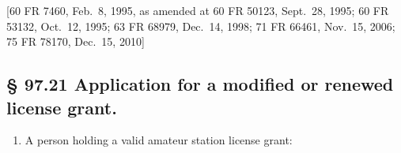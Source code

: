 \documentclass[
  letterpaper,
  DIV=11,
  numbers=noendperiod]{scrreport}
\providecommand{\tightlist}{%
  \setlength{\itemsep}{0pt}\setlength{\parskip}{0pt}}\usepackage{longtable,booktabs,array}
\begin{document}
{[}60 FR 7460, Feb.~8, 1995, as amended at 60 FR 50123, Sept.~28, 1995;
60 FR 53132, Oct.~12, 1995; 63 FR 68979, Dec.~14, 1998; 71 FR 66461,
Nov.~15, 2006; 75 FR 78170, Dec.~15, 2010{]}

\hypertarget{97.21}{%
\subsection*{§ 97.21 Application for a modified or renewed license
grant.}\label{97.21}}

\begin{enumerate}
\def\labelenumi{(\alph{enumi})}
\tightlist
\item
  A person holding a valid amateur station license grant:
\end{enumerate}
\end{document}
